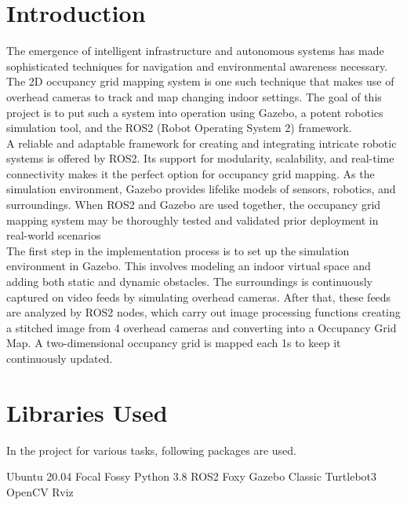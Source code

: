 \documentclass{josis}
\begin{document}
\section{Introduction}
 The emergence of intelligent infrastructure and autonomous systems has made sophisticated techniques for navigation and environmental awareness necessary. The 2D occupancy grid mapping system is one such technique that makes use of overhead cameras to track and map changing indoor settings. The goal of this project is to put such a system into operation using Gazebo, a potent robotics simulation tool, and the ROS2 (Robot Operating System 2) framework.\\
A reliable and adaptable framework for creating and integrating intricate robotic systems is offered by ROS2. Its support for modularity, scalability, and real-time connectivity makes it the perfect option for occupancy grid mapping. As the simulation environment, Gazebo provides lifelike models of sensors, robotics, and surroundings. When ROS2 and Gazebo are used together, the occupancy grid mapping system may be thoroughly tested and validated prior deployment in real-world scenarios\\
The first step in the implementation process is to set up the simulation environment in Gazebo. This involves modeling an indoor virtual space and adding both static and dynamic obstacles. The surroundings is continuously captured on video feeds by simulating overhead cameras. After that, these feeds are analyzed by ROS2 nodes, which carry out image processing functions creating a stitched image from 4 overhead cameras and converting into a Occupancy Grid Map. A two-dimensional occupancy grid is mapped each 1s to keep it continuously updated.\\




\section{Libraries Used}
In the project for various tasks, following packages are used.
\begin{python}
    Ubuntu 20.04 Focal Fossy
    Python 3.8
    ROS2 Foxy
    Gazebo Classic
    Turtlebot3
    OpenCV
    Rviz
    
\end{python}
\end{document}
